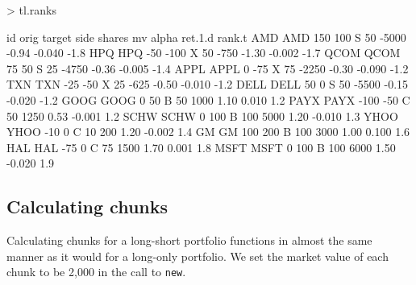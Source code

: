 \documentclass{article}
\begin{document}
\begin{Schunk}
\begin{Sinput}
> tl.ranks
\end{Sinput}
\begin{Soutput}
       id orig target side shares    mv alpha ret.1.d rank.t
AMD   AMD  150    100    S     50 -5000 -0.94  -0.040   -1.8
HPQ   HPQ  -50   -100    X     50  -750 -1.30  -0.002   -1.7
QCOM QCOM   75     50    S     25 -4750 -0.36  -0.005   -1.4
APPL APPL    0    -75    X     75 -2250 -0.30  -0.090   -1.2
TXN   TXN  -25    -50    X     25  -625 -0.50  -0.010   -1.2
DELL DELL   50      0    S     50 -5500 -0.15  -0.020   -1.2
GOOG GOOG    0     50    B     50  1000  1.10   0.010    1.2
PAYX PAYX -100    -50    C     50  1250  0.53  -0.001    1.2
SCHW SCHW    0    100    B    100  5000  1.20  -0.010    1.3
YHOO YHOO  -10      0    C     10   200  1.20  -0.002    1.4
GM     GM  100    200    B    100  3000  1.00   0.100    1.6
HAL   HAL  -75      0    C     75  1500  1.70   0.001    1.8
MSFT MSFT    0    100    B    100  6000  1.50  -0.020    1.9
\end{Soutput}
\end{Schunk}


\subsection{Calculating chunks}

Calculating chunks for a long-short portfolio functions in almost the
same manner as it would for a long-only portfolio.  We set the market
value of each chunk to be 2,000
in the call to \texttt{new}.
\end{document}
